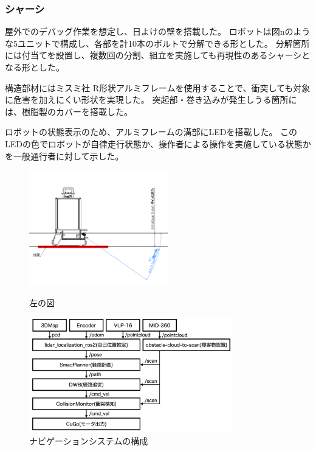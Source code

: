 \subsubsection{シャーシ}
屋外でのデバッグ作業を想定し、日よけの壁を搭載した。
ロボットは図nのような5ユニットで構成し、各部を計10本のボルトで分解できる形とした。
分解箇所には付当てを設置し、複数回の分割、組立を実施しても再現性のあるシャーシとなる形とした。

構造部材にはミスミ社 R形状アルミフレーム\cite{MISUMI}を使用することで、衝突しても対象に危害を加えにくい形状を実現した。
突起部・巻き込みが発生しうる箇所には、樹脂製のカバーを搭載した。

ロボットの状態表示のため、アルミフレームの溝部にLEDを搭載した。
このLEDの色でロボットが自律走行状態か、操作者による操作を実施している状態かを一般通行者に対して示した。

\begin{figure}[H]
    \centering
    \begin{minipage}[b]{0.45\hsize}
       \centering
       \includegraphics[height=5cm]{fig/obstacle_detection_range_sideview.png}
       \caption{左の図}
       \label{fig:detection}
    \end{minipage}
    \begin{minipage}[b]{0.45\hsize}
       \centering
       \includegraphics[height=5cm]{fig/system.png}
       \caption{ナビゲーションシステムの構成}
       \label{fig:system}
    \end{minipage}
\end{figure}

